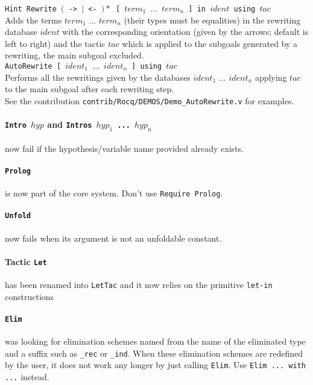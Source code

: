 \documentclass[11pt]{article}
\begin{document}
  {\tt Hint Rewrite $($ -> $|$ <- $)*$ [ $term_1$ $...$ $term_n$ ] in
    $ident$ using $tac$}\\

  Adds the terms $term_1$ $...$ $term_n$ (their types must be equalities) in
  the rewriting database $ident$ with the corresponding orientation (given by
  the arrows; default is left to right) and the tactic $tac$ which is applied
  to the subgoals generated by a rewriting, the main subgoal excluded.\\

  {\tt AutoRewrite  [ $ident_1$ $...$ $ident_n$ ] using $tac$}\\

  Performs all the rewritings given by the databases $ident_1$ $...$ $ident_n$
  applying $tac$ to the main subgoal after each rewriting step.\\

  See the contribution \texttt{contrib/Rocq/DEMOS/Demo\_AutoRewrite.v} for
  examples.

  \paragraph{{\tt Intro $hyp$} and {\bf \tt Intros $hyp_1$ ... $hyp_n$}}
  now fail if the hypothesis/variable name provided already exists.

  \paragraph{{\tt Prolog}} is now part of the core
  system. Don't use {\tt Require Prolog}.

  \paragraph{{\tt Unfold}} now fails when its argument is not an
  unfoldable constant.

  \paragraph{Tactic {\tt Let}} has been renamed into {\tt LetTac}
  and it now relies on the primitive {\tt let-in} constructions

  \paragraph{{\tt Elim}} was looking for elimination schemes named
  from the name of the eliminated type and a suffix such as
  \verb:_rec: or \verb:_ind:. When these elimination schemes are
  redefined by the user, it does not work any longer by just calling
  {\tt Elim}. Use {\tt Elim ... with ...} instead.
\end{document}
